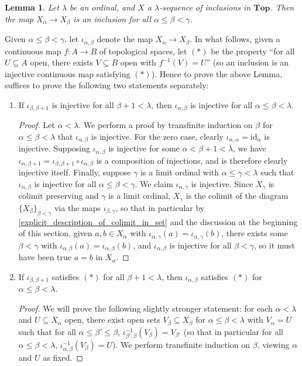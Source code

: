 \documentclass{amsart}
\theoremstyle{plain}
\newtheorem{lemma}[theorem]{Lemma}
\theoremstyle{definition}
\newcommand{\Top}{\mbf{Top}}
\newcommand{\sseq}{\subseteq}
\newcommand{\0}{\mathbf{0}}
\newcommand{\id}{\mathrm{id}}
\newcommand{\mbf}[1]{\mathbf{#1}}
\renewcommand{\(}{\left(}
\renewcommand{\)}{\right)}
\begin{document}
\pagebreak
\begin{lemma}\label{lambda_sequence_of_inclusions_makes_everything_an_inclusion}
  Let $\lambda$ be an ordinal, and $X$ a $\lambda$-sequence of inclusions in $\Top$. Then the map $X_\alpha\to X_\beta$ is an inclusion for all $\alpha\leq\beta<\gamma$.
\end{lemma}
Given $\alpha\leq\beta<\gamma$, let $\iota_{\alpha,\beta}$ denote the map $X_\alpha\to X_\beta$. In what follows, given a continuous map $f:A\to B$ of topological spaces, let $(\ast)$ be the property ``for all $U\sseq A$ open, there exists $V\sseq B$ open with $f^{-1}(V)=U$'' (so an inclusion is an injective continuous map satisfying $(\ast)$). Hence to prove the above Lemma, suffices to prove the following two statements separately:
\begin{enumerate}[label=(\arabic*),listparindent=\parindent,parsep=5pt]
  \item If $\iota_{\beta,\beta+1}$ is injective for all $\beta+1<\lambda$, then $\iota_{\alpha,\beta}$ is injective for all $\alpha\leq\beta<\lambda$.
  \begin{proof}
    Let $\alpha<\lambda$. We perform a proof by transfinite induction on $\beta$ for $\alpha\leq\beta<\lambda$ that $\iota_{\alpha,\beta}$ is injective. For the zero case, clearly $\iota_{\alpha,\alpha}=\id_\alpha$ is injective. Supposing $\iota_{\alpha,\beta}$ is injective for some $\alpha<\beta+1<\lambda$, we have $\iota_{\alpha,\beta+1}=\iota_{\beta,\beta+1}\circ\iota_{\alpha,\beta}$ is a composition of injections, and is therefore clearly injective itself. Finally, suppose $\gamma$ is a limit ordinal with $\alpha\leq\gamma<\lambda$ such that $\iota_{\alpha,\beta}$ is injective for all $\alpha\leq\beta<\gamma$. We claim $\iota_{\alpha,\gamma}$ is injective. Since $X_\gamma$ is colimit preserving and $\gamma$ is a limit ordinal, $X_\gamma$ is the colimit of the diagram $\{X_\beta\}_{\beta<\gamma}$ via the maps $\iota_{\beta,\gamma}$, so that in particular by \autoref{explicit_description_of_colimit_in_set} and the discussion at the beginning of this section, given $a,b\in X_\alpha$ with $\iota_{\alpha,\gamma}(a)=\iota_{\alpha,\gamma}(b)$, there exists some $\beta<\gamma$ with $\iota_{\alpha,\beta}(a)=\iota_{\alpha,\beta}(b)$, and $\iota_{\alpha,\beta}$ is injective for all $\beta<\gamma$, so it must have been true $a=b$ in $X_\alpha$. 
  \end{proof}
  \item If $\iota_{\beta,\beta+1}$ satisfies $(\ast)$ for all $\beta+1<\lambda$, then $\iota_{\alpha,\beta}$ satisfies $(\ast)$ for $\alpha\leq\beta<\lambda$.
  \begin{proof}
   We will prove the following slightly stronger statement: for each $\alpha<\lambda$ and $U\sseq X_\alpha$ open, there exist open sets $V_\beta\sseq X_\beta$ for $\alpha\leq\beta<\lambda$ with $V_\alpha=U$ such that for all $\alpha\leq\beta'\leq\beta$, $\iota_{\beta',\beta}^{-1}(V_{\beta})=V_{\beta'}$ (so that in particular for all $\alpha\leq\beta<\lambda$, $\iota_{\alpha,\beta}^{-1}(V_\beta)=U$). We perform transfinite induction on $\beta$, viewing $\alpha$ and $U$ as fixed.


\end{proof}
\end{enumerate}
\end{document}
